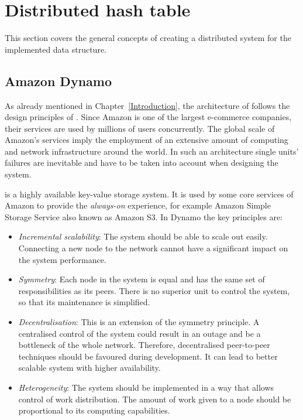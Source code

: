     
\section{Distributed hash table}

    This section covers the general concepts of creating a distributed system for the implemented data structure. 

    \subsection{Amazon Dynamo}
        As already mentioned in Chapter~\ref{Introduction}, the architecture of \DHTS follows the design principles of \Dynamo \cite{AmazonDynamo}. 
        Since Amazon is one of the largest e-commerce companies, their services are used by millions of users concurrently.
        The global scale of Amazon's services imply the employment of an extensive amount of computing and network infrastructure around the world.
        In such an architecture single units' failures are inevitable and have to be taken into account when designing the system.
        
        \Dynamo is a highly available key-value storage system.
        It is used by some core services of Amazon to provide the \emph{always-on} experience, for example Amazon Simple Storage Service \cite{AmazonS3} also known as Amazon S3.
        In Dynamo the key principles are:
        
        \begin{itemize}
            \item \textit{Incremental scalability}:
                The system should be able to scale out easily.
                Connecting a new node to the network cannot have a significant impact on the system performance.
            \item \textit{Symmetry}:
                Each node in the system is equal and has the same set of responsibilities as its peers. 
                There is no superior unit to control the system, so that its maintenance is simplified.
            \item \textit{Decentralisation}:
                This is an extension of the symmetry principle.
                A centralised control of the system could result in an outage and be a bottleneck of the whole network.
                Therefore, decentralised peer-to-peer techniques should be favoured during development.
                It can lead to better scalable system with higher availability.
            \item \textit{Heterogeneity}:
                The system should be implemented in a way that allows control of work distribution. 
                The amount of work given to a node should be proportional to its computing capabilities.
        \end{itemize}

